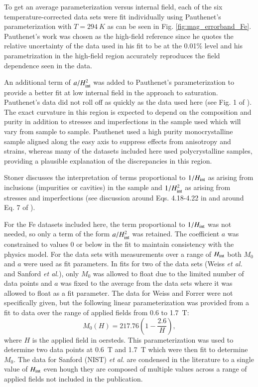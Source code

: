 \documentclass[preprint,12pt]{elsarticle}
\begin{document}
To get an average parameterization versus internal field, each of the six temperature-corrected data sets were fit individually using Pauthenet's parameterization with $T=294~K$ as can be seen in Fig. \ref{fig:mag_errorband_Fe}. Pauthenet's work was chosen as the high-field reference since he quotes the relative uncertainty of the data used in his fit to be at the 0.01\% level and his parametrization in the high-field region accurately reproduces the field dependence seen in the data. 

An additional term of $a/H_{\rm int}^2$ was added to Pauthenet's parameterization to provide a better fit at low internal field in the approach to saturation. Pauthenet's data  did not roll off as quickly as the data used here (see Fig. 1 of \cite{PauthenetMar1982}). The exact curvature in this region is expected to depend on the composition and purity in addition to stresses and imperfections in the sample used which will vary from sample to sample. Pauthenet used a high purity monocrystalline sample aligned along the easy axis to suppress effects from anisotropy and strains, whereas many of the datasets included here used polycrystalline samples, providing a plausible explanation of the discrepancies in this region. 

Stoner discusses the interpretation of terms proportional to $1/H_{\rm int}$ as arising from inclusions (impurities or cavities) in the sample and $1/H_{\rm int}^2$ as arising from stresses and imperfections (see discussion around Eqs. 4.18-4.22 in \cite{Stoner1950} and around Eq. 7 of \cite{Foner1956}). 

For the Fe datasets included here, the term proportional to $1/H_{\rm int}$ was not needed, so only a term of the form $a/H_{\rm int}^2$ was retained. The coefficient $a$ was constrained to values 0 or below in the fit to maintain consistency with the physics model. For the data sets with measurements over a range of $H_{\rm int}$ both $M_0$ and $a$ were used as fit parameters. In fits for two of the data sets (Weiss {\it et al.} and Sanford {\it et al.}), only $M_0$ was allowed to float due to the limited number of data points and $a$ was fixed to the average from the data sets where it was allowed to float as a fit parameter. The data for Weiss and Forrer were not specifically given, but the following linear parameterization was provided from a fit to data over the range of applied fields from 0.6 to 1.7~T: \cite{Weiss1929}
\[
M_0(H)=217.76\left(1-\frac{2.6}{H}\right),
\]
where $H$ is the applied field in oersteds. This parameterization was used to determine two data points at 0.6~T and 1.7~T which were then fit to determine $M_0$. The data for Sanford (NIST) {\it et al.} are condensed in the literature to a single value of $H_{\rm int}$ even hough they are composed of multiple values across a range of applied fields not included in the publication. 
\end{document}
